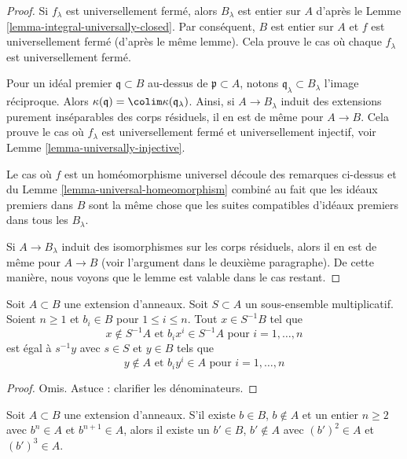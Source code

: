 \begin{proof}
Si $f_\lambda$ est universellement fermé, alors $B_\lambda$
est entier sur $A$ d'après
le Lemme \ref{lemma-integral-universally-closed}. Par conséquent, $B$
est entier sur $A$ et $f$
est universellement fermé (d'après le même lemme).
Cela prouve le cas où chaque $f_\lambda$ est universellement fermé.

\medskip\noindent
Pour un idéal premier $\mathfrak q \subset B$ au-dessus de $\mathfrak p \subset A$,
notons $\mathfrak q_\lambda \subset B_\lambda$ l'image réciproque. Alors $\kappa(\mathfrak q) = \colim \kappa(\mathfrak q_\lambda)$.
Ainsi, si $A \to B_\lambda$ induit des extensions
purement inséparables des corps résiduels, il
en est de même pour $A \to B$. Cela prouve le cas où $f_\lambda$
est universellement fermé et universellement injectif,
voir Lemme \ref{lemma-universally-injective}.

\medskip\noindent
Le cas où $f$ est un homéomorphisme universel découle
des remarques ci-dessus et du Lemme \ref{lemma-universal-homeomorphism} combiné au fait
que les idéaux premiers dans $B$ sont la même chose que les
suites compatibles d'idéaux premiers dans tous les $B_\lambda$.

\medskip\noindent Si $A \to B_\lambda$
induit des isomorphismes sur les corps résiduels, alors il en est de même
pour $A \to B$ (voir l'argument dans le deuxième paragraphe).
De cette manière, nous voyons que le lemme est valable dans le cas restant.
\end{proof}

\begin{lemma}
\label{lemma-special-elements-and-localization}
Soit $A \subset B$ une extension d'anneaux. Soit $S \subset A$ un
sous-ensemble multiplicatif. Soient $n \geq 1$
et $b_i \in B$ pour $1 \leq i \leq n$. Tout $x \in S^{-1}B$ tel que
$$
x \not \in S^{-1}A\text{ et } b_i x^i \in S^{-1}A\text{ pour }i = 1, \ldots, n
$$
est égal à $s^{-1}y$ avec $s \in S$ et $y \in B$ tels que
$$
y \not \in A\text{ et } b_i y^i \in A\text{ pour }i = 1, \ldots, n
$$
\end{lemma}

\begin{proof}
Omis. Astuce : clarifier les dénominateurs.
\end{proof}

\begin{lemma}
\label{lemma-nth-and-nplusone-implies-square-and-cube}
Soit $A \subset B$ une extension d'anneaux. S'il existe
$b \in B$, $b \not \in A$ et un entier $n \geq 2$
avec $b^n \in A$ et $b^{n + 1} \in A$, alors il existe
un $b' \in B$, $b' \not \in A$
avec $(b')^2 \in A$ et $(b')^3 \in A$.
\end{lemma}

